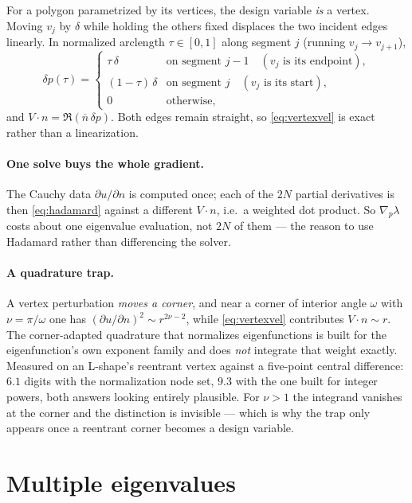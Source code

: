 \documentclass[11pt]{article}
\theoremstyle{definition}
\begin{document}
For a polygon parametrized by its vertices, the design variable \emph{is} a vertex. Moving $v_j$
by $\delta$ while holding the others fixed displaces the two incident edges linearly. In
normalized arclength $\tau\in[0,1]$ along segment $j$ (running $v_j\to v_{j+1}$),
\begin{equation}\label{eq:vertexvel}
  \delta p(\tau)=
  \begin{cases}
    \tau\,\delta & \text{on segment } j-1\quad(\text{$v_j$ is its endpoint}),\\
    (1-\tau)\,\delta & \text{on segment } j\quad(\text{$v_j$ is its start}),\\
    0 & \text{otherwise},
  \end{cases}
\end{equation}
and $V\!\cdot\!n=\Re(\overline{n}\,\delta p)$. Both edges remain straight, so \eqref{eq:vertexvel}
is exact rather than a linearization.

\paragraph{One solve buys the whole gradient.} The Cauchy data $\partial u/\partial n$ is
computed once; each of the $2N$ partial derivatives is then \eqref{eq:hadamard} against a
different $V\!\cdot\!n$, i.e.\ a weighted dot product. So $\nabla_p\lambda$ costs about one
eigenvalue evaluation, not $2N$ of them --- the reason to use Hadamard rather than differencing
the solver.

\paragraph{A quadrature trap.} A vertex perturbation \emph{moves a corner}, and near a corner of
interior angle $\omega$ with $\nu=\pi/\omega$ one has
$(\partial u/\partial n)^2\sim r^{2\nu-2}$, while \eqref{eq:vertexvel} contributes
$V\!\cdot\!n\sim r$. The corner-adapted quadrature that normalizes eigenfunctions is built for the
eigenfunction's own exponent family and does \emph{not} integrate that weight exactly. Measured
on an L-shape's reentrant vertex against a five-point central difference: $6.1$ digits with the
normalization node set, $9.3$ with the one built for integer powers, both answers looking
entirely plausible. For $\nu>1$ the integrand vanishes at the corner and the distinction is
invisible --- which is why the trap only appears once a reentrant corner becomes a design
variable.

\section{Multiple eigenvalues}\label{sec:degen}
\end{document}
